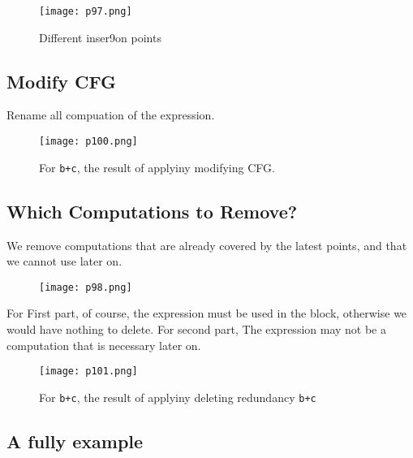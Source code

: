 \begin{figure}[H]
    \centering
     \texttt{[image: p97.png]}
         \caption{	Different	inser9on	points}
         \label{fig:p97}
\end{figure}
\subsection{Modify CFG}

Rename all compuation of the expression.  

\begin{figure}[H]
    \centering
     \texttt{[image: p100.png]}
         \caption{For \texttt{b+c}, the result of applyiny modifying CFG.}
         \label{fig:p100}
\end{figure}


\subsection{Which	Computations	to	Remove?	}
We	remove	computations	that	are	already	covered	by	
the	latest	points,	and	that	we	cannot	use	later	on.	

\begin{figure}[H]
    \centering
     \texttt{[image: p98.png]}
         
         \label{fig:p98}
\end{figure}




For {\color{red} First} part, of	course,	the	expression	
must	be	used	in	the	block,	
otherwise	we	would	have	
nothing	to	delete. For {\color{blue} second} part, The	expression	may	not	be	a	
computation	that	is	necessary	
later	on.	


\begin{figure}[H]
    \centering
     \texttt{[image: p101.png]}
         \caption{For \texttt{b+c}, the result of applyiny deleting redundancy \texttt{b+c}}
         \label{fig:p100}
\end{figure}



\subsection{A fully example}






